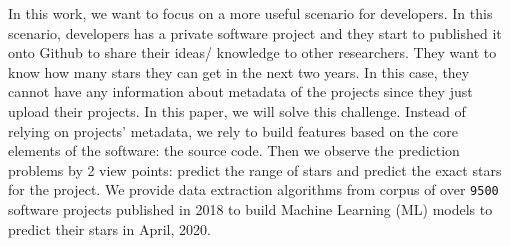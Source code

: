 In this work, we want to focus on a more useful scenario for developers. In this scenario, developers has a private software project and they start to published it onto Github to share their ideas/ knowledge to other researchers. They want to know how many stars they can get in the next two years. In this case, they cannot have any information about metadata of the projects since they just upload their projects. In this paper, we will solve this challenge. Instead of relying on projects' metadata, we rely to build features based on the core elements of the software: the source code. Then we observe the prediction problems by 2 view points: predict the range of stars and predict the exact stars for the project. We provide data extraction algorithms from corpus of over \texttt{9500} software projects published in 2018 to build Machine Learning (ML) models to predict their stars in April, 2020.  


